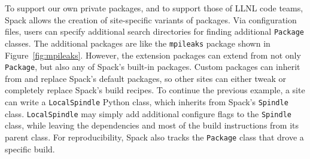 To support our own private packages, and to support those of LLNL code teams,
Spack allows the creation of site-specific variants of packages.
Via configuration files, users can specify additional search
directories for finding additional {\tt Package} classes.
%
The additional packages are like the {\tt mpileaks} package shown in Figure~\ref{fig:mpileaks}.  However, the extension packages can extend from not
only {\tt Package}, but also any of Spack's built-in packages.
Custom packages can inherit from and replace Spack's default
packages, so other sites can either tweak or completely replace Spack's
build recipes.  To continue the previous example, a site can write
a {\tt LocalSpindle} Python class, which inherits from Spack's
{\tt Spindle} class.  {\tt LocalSpindle} may simply add additional
configure flags to the {\tt Spindle} class, while leaving the
dependencies and most of the build instructions from its parent
class.  For reproducibility, Spack also tracks the {\tt Package}
class that drove a specific build.
